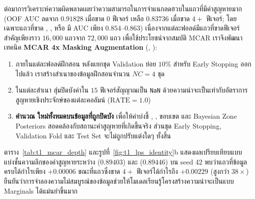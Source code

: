 ต่อมาการวิเคราะห์ความผิดพลาดเผยว่าความสามารถในการจำแนกลดฮวบในแถวที่มีค่าสูญหายมาก (OOF AUC ลดจาก $0.91828$ เมื่อขาด $0$ ฟีเจอร์ เหลือ $0.83736$ เมื่อขาด $4+$ ฟีเจอร์; โดยเฉพาะแถวที่ขาด , ,  หรือ  มี AUC เพียง $0.854$--$0.863$) เนื่องจากแต่ละฟอลด์มีแถวที่ขาดฟีเจอร์สำคัญเพียงราว $16,000$ แถวจาก $72,000$ แถว เพื่อใช้ประโยชน์จากสมบัติ MCAR เราจึงพัฒนาเทคนิค \textbf{MCAR 4x Masking Augmentation} (, ):
\begin{enumerate}
  \item ภายในแต่ละฟอลด์ฝึกสอน หลังแยกชุด Validation ย่อย $10\%$ สำหรับ Early Stopping ออกไปแล้ว เราสร้างสำเนาของข้อมูลฝึกสอนจำนวน $NC = 4$ ชุด
  \item ในแต่ละสำเนา สุ่มปิดบังค่าใน $15$ ฟีเจอร์สัญญาณเป็น \texttt{NaN} ด้วยความน่าจะเป็นเท่ากับอัตราการสูญหายเชิงประจักษ์ของแต่ละคอลัมน์ ($\text{RATE} = 1.0$)
  \item \textbf{คำนวณ  ใหม่ทั้งหมดบนข้อมูลที่ถูกปิดบัง} เพื่อให้ค่าบ่งชี้ , , ขอบเขต  และ Bayesian Zone Posteriors สอดคล้องกับสถานะค่าสูญหายที่เกิดขึ้นจริง ส่วนชุด Early Stopping, Validation Fold และ Test Set จะไม่ถูกปรับแต่งใดๆ ทั้งสิ้น
\end{enumerate}
ตาราง~\ref{tab:t1_mcar_depth} และรูปที่~\ref{fig:t1_lps_identity}b แสดงผลเปรียบเทียบแบบแบ่งชั้นความลึกของค่าสูญหายระหว่าง  ($0.89403$) และ  ($0.89446$) บน seed 42 พบว่าแถวที่ข้อมูลครบได้กำไรเพียง $+0.00006$ ขณะที่แถวซึ่งขาด $4+$ ฟีเจอร์ได้กำไรถึง $+0.00229$ (สูงกว่า $38\times$) ยืนยันว่าการจำลองความไม่สมบูรณ์ของข้อมูลช่วยให้โมเดลเรียนรู้โครงสร้างความน่าจะเป็นแบบ Marginals ได้แม่นยำขึ้นมาก

